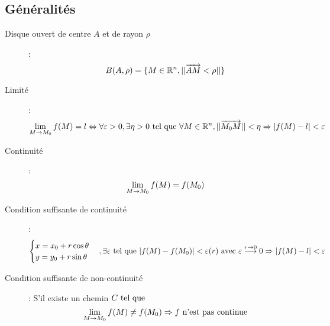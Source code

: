 \subsection{Généralités}
\begin{description}
\item[Disque ouvert de centre $A$ et de rayon $\rho$] :
    \[
        B(A,\rho)=\{M\in\mathbb{R}^n,||\overrightarrow{AM}<\rho||\}
    \]
\item[Limité] :
    \[
        \lim_{M\rightarrow M_0}f(M)=l
        \Leftrightarrow
        \forall\varepsilon >0,
        \exists\eta > 0\textrm{ tel que }
        \forall M\in\mathbb{R}^n,
        ||\overrightarrow{M_0M}||<\eta
        \Rightarrow
        |f(M)-l|<\varepsilon
    \]
\item[Continuité] :
    \[
        \lim_{M\rightarrow M_0}f(M)=f(M_0)
    \]
\item[Condition suffisante de continuité] :
    \[
        \begin{cases}
            x=x_0+r\cos\theta\\
            y=y_0+r\sin\theta
        \end{cases},
        \exists\varepsilon\textrm{ tel que }
        |f(M)-f(M_0)|<\varepsilon(r)
        \textrm{ avec }\varepsilon\overset{r\rightarrow 0}{\longrightarrow}0
        \Rightarrow
        |f(M)-l|<\varepsilon
    \]
\item[Condition suffisante de non-continuité] : S'il existe un chemin $C\textrm{ tel que }$
    \[
        \lim_{M\rightarrow M_0}f(M)\ne f(M_0)\Rightarrow f\textrm{ n'est pas continue}
    \]
\end{description}

